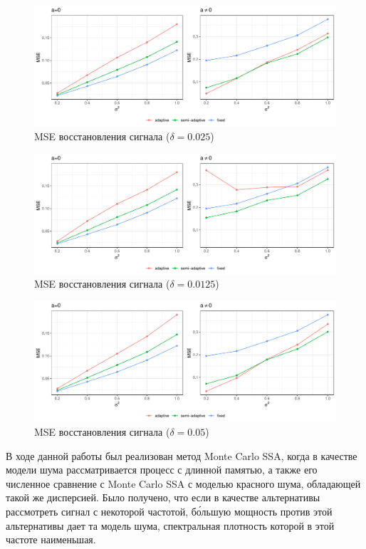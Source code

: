 \documentclass[specialist,
substylefile = spbu_report.rtx,
subf,href,colorlinks=true, 12pt]{disser}
\theoremstyle{definition}
\begin{document}
\begin{figure}[h!]
	\centering
	\includegraphics[width=\linewidth]{img/mse.pdf}
	\caption{MSE восстановления сигнала ($\delta=0.025$)}
	\label{fig:mse1}
\end{figure}
\begin{figure}[h!]
	\centering
	\includegraphics[width=\linewidth]{img/mse_delta_smaller.pdf}
	\caption{MSE восстановления сигнала ($\delta=0.0125$)}
	\label{fig:mse2}
\end{figure}
\begin{figure}[h!]
	\centering
	\includegraphics[width=\linewidth]{img/mse_delta_bigger.pdf}
	\caption{MSE восстановления сигнала ($\delta=0.05$)}
	\label{fig:mse3}
\end{figure}

\conclusion

В ходе данной работы был реализован метод Monte Carlo SSA, когда в качестве модели шума рассматривается процесс с длинной памятью, а также его численное сравнение с Monte Carlo SSA с моделью красного шума, обладающей такой же дисперсией. Было получено, что если в качестве альтернативы рассмотреть сигнал с некоторой частотой, б\'{о}льшую мощность против этой альтернативы дает та модель шума, спектральная плотность которой в этой частоте наименьшая.
\end{document}
